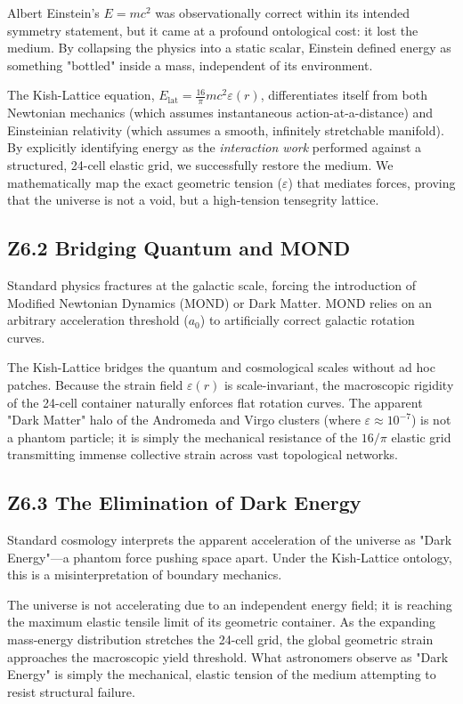\documentclass[11pt, letterpaper, openany]{book}
\begin{document}
Albert Einstein's $E=mc^2$ was observationally correct within its intended symmetry statement, but it came at a profound ontological cost: it lost the medium. By collapsing the physics into a static scalar, Einstein defined energy as something "bottled" inside a mass, independent of its environment. 

The Kish-Lattice equation, $E_{\mathrm{lat}} = \frac{16}{\pi}mc^2 \varepsilon(r)$, differentiates itself from both Newtonian mechanics (which assumes instantaneous action-at-a-distance) and Einsteinian relativity (which assumes a smooth, infinitely stretchable manifold). By explicitly identifying energy as the \textit{interaction work} performed against a structured, 24-cell elastic grid, we successfully restore the medium. We mathematically map the exact geometric tension ($\varepsilon$) that mediates forces, proving that the universe is not a void, but a high-tension tensegrity lattice.

\subsection*{Z6.2 Bridging Quantum and MOND}

Standard physics fractures at the galactic scale, forcing the introduction of Modified Newtonian Dynamics (MOND) or Dark Matter. MOND relies on an arbitrary acceleration threshold ($a_0$) to artificially correct galactic rotation curves. 

The Kish-Lattice bridges the quantum and cosmological scales without ad hoc patches. Because the strain field $\varepsilon(r)$ is scale-invariant, the macroscopic rigidity of the 24-cell container naturally enforces flat rotation curves. The apparent "Dark Matter" halo of the Andromeda and Virgo clusters (where $\varepsilon \approx 10^{-7}$) is not a phantom particle; it is simply the mechanical resistance of the $16/\pi$ elastic grid transmitting immense collective strain across vast topological networks. 

\subsection*{Z6.3 The Elimination of Dark Energy}

Standard cosmology interprets the apparent acceleration of the universe as "Dark Energy"—a phantom force pushing space apart. Under the Kish-Lattice ontology, this is a misinterpretation of boundary mechanics. 

The universe is not accelerating due to an independent energy field; it is reaching the maximum elastic tensile limit of its geometric container. As the expanding mass-energy distribution stretches the 24-cell grid, the global geometric strain approaches the macroscopic yield threshold. What astronomers observe as "Dark Energy" is simply the mechanical, elastic tension of the medium attempting to resist structural failure. 
\end{document}

